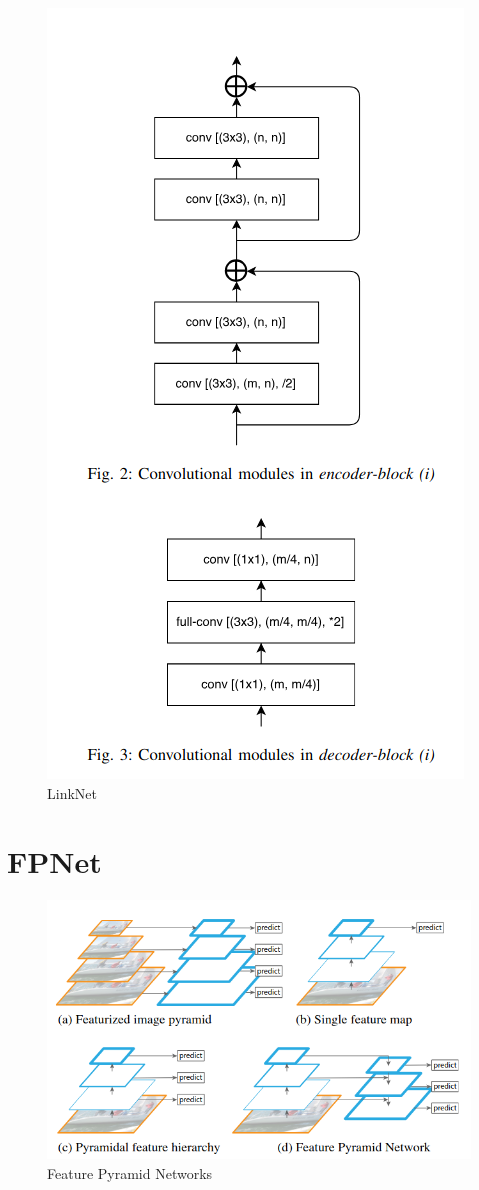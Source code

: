 \documentclass[11pt]{beamer}
\begin{document}
\begin{figure}
\begin{center}
    \includegraphics[scale=1.1]{images/linknet-blocks.png}
  \end{center}
  \caption{LinkNet}\label{fig:}
\end{figure}

\section{FPNet}
\begin{figure}
  \begin{center}
    \includegraphics[scale=1.1]{images/fpnet.png}
  \end{center}
  \caption{Feature Pyramid Networks}\label{fig:}
\end{figure}
\end{document}
